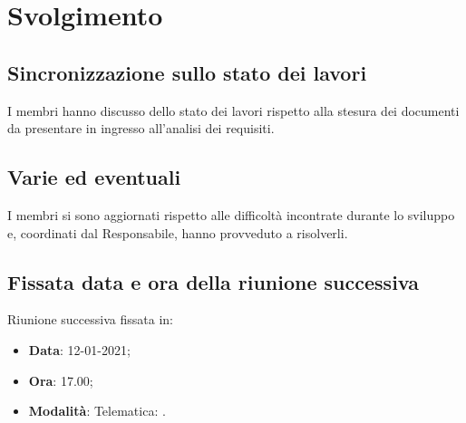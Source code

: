 \documentclass[]{article}
\begin{document}
	\newpage

	\section{Svolgimento}
		\subsection{Sincronizzazione sullo stato dei lavori}
		I membri hanno discusso dello stato dei lavori rispetto alla stesura dei documenti da presentare in ingresso all'analisi dei requisiti.\\
		
		\subsection{Varie ed eventuali}
		I membri si sono aggiornati rispetto alle difficoltà incontrate durante lo sviluppo e, coordinati dal Responsabile, hanno provveduto a risolverli.\\
		
		\subsection{Fissata data e ora della riunione successiva}
		Riunione successiva fissata in:
		\begin{itemize}
			\item \textbf{Data}: 12-01-2021;
			\item \textbf{Ora}: 17.00;
			\item \textbf{Modalità}: Telematica: .
		\end{itemize}
	
\end{document}
